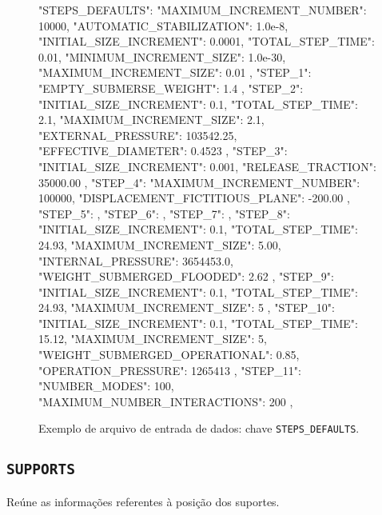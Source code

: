\begin{figure}
\caption{Exemplo de arquivo de entrada de dados: chave \texttt{STEPS\_DEFAULTS}.\label{lst:steps_defaults}}
\begin{jsoncode}
{
"STEPS_DEFAULTS": {
  "MAXIMUM_INCREMENT_NUMBER": 10000,
  "AUTOMATIC_STABILIZATION": 1.0e-8,
  "INITIAL_SIZE_INCREMENT": 0.0001,
  "TOTAL_STEP_TIME": 0.01,
  "MINIMUM_INCREMENT_SIZE": 1.0e-30,
  "MAXIMUM_INCREMENT_SIZE": 0.01
  },
  "STEP_1": {
    "EMPTY_SUBMERSE_WEIGHT": 1.4
    },
    "STEP_2": {
      "INITIAL_SIZE_INCREMENT": 0.1,
      "TOTAL_STEP_TIME": 2.1,
      "MAXIMUM_INCREMENT_SIZE": 2.1,
      "EXTERNAL_PRESSURE": 103542.25,
      "EFFECTIVE_DIAMETER": 0.4523
  },
  "STEP_3": {
    "INITIAL_SIZE_INCREMENT": 0.001,
    "RELEASE_TRACTION": 35000.00
  },
  "STEP_4": {
    "MAXIMUM_INCREMENT_NUMBER": 100000,
    "DISPLACEMENT_FICTITIOUS_PLANE": -200.00
  },
  "STEP_5": {},
  "STEP_6": {},
  "STEP_7": {},
  "STEP_8": {
    "INITIAL_SIZE_INCREMENT": 0.1,
  "TOTAL_STEP_TIME": 24.93,
  "MAXIMUM_INCREMENT_SIZE": 5.00,
  "INTERNAL_PRESSURE": 3654453.0,
  "WEIGHT_SUBMERGED_FLOODED": 2.62
  },
  "STEP_9": {
    "INITIAL_SIZE_INCREMENT": 0.1,
    "TOTAL_STEP_TIME": 24.93,
    "MAXIMUM_INCREMENT_SIZE": 5
  },
  "STEP_10": {
    "INITIAL_SIZE_INCREMENT": 0.1,
    "TOTAL_STEP_TIME": 15.12,
    "MAXIMUM_INCREMENT_SIZE": 5,
    "WEIGHT_SUBMERGED_OPERATIONAL": 0.85,
    "OPERATION_PRESSURE": 1265413
  },
  "STEP_11": {
    "NUMBER_MODES": 100,
    "MAXIMUM_NUMBER_INTERACTIONS": 200
  },
}
\end{jsoncode}
\end{figure}

\subsection{\texttt{SUPPORTS}}

Reúne as informações referentes à posição dos suportes.

